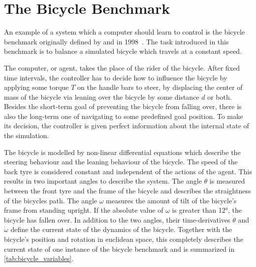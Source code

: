 \chapter{The Bicycle Benchmark}
\label{cha:the_bicycle_benchmark}
An example of a system which a computer should learn to control is the bicycle benchmark originally defined by \Randlov{} and \Alstrom{} in 1998~\cite{randlov_learning_1998}.
The task introduced in this benchmark is to balance a simulated bicycle which travels at a constant speed.

The computer, or agent, takes the place of the rider of the bicycle.
After fixed time intervals, the controller has to decide how to influence the bicycle by applying some torque $T$ on the handle bars to steer, by displacing the center of mass of the bicycle via leaning over the bicycle by some distance $d$ or both.
Besides the short-term goal of preventing the bicycle from falling over, there is also the long-term one of navigating to some predefined goal position.
To make its decision, the controller is given perfect information about the internal state of the simulation.

The bicycle is modelled by non-linear differential equations which describe the steering behaviour and the leaning behaviour of the bicycle.
The speed of the back tyre is considered constant and independent of the actions of the agent.
This results in two important angles to describe the system.
The angle $\theta$ is measured between the front tyre and the frame of the bicycle and describes the straightness of the bicycles path.
The angle $\omega$ measures the amount of tilt of the bicycle's frame from standing upright.
If the absolute value of $\omega$ is greater than \ang{12}, the bicycle has fallen over.
In addition to the two angles, their time-derivatives $\dot{\theta}$ and $\dot{\omega}$ define the current state of the dynamics of the bicycle.
Together with the bicycle's position and rotation in euclidean space, this completely describes the current state of one instance of the bicycle benchmark and is summarized in \cref{tab:bicycle_variables}.

